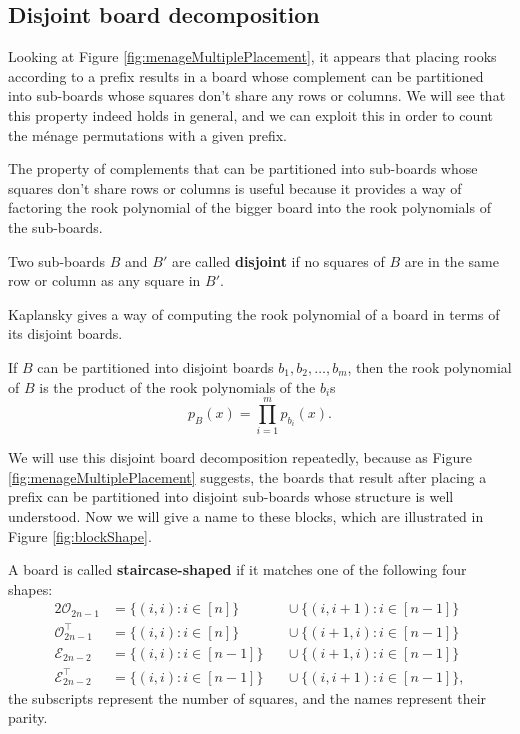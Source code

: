 \subsection{Disjoint board decomposition}
Looking at Figure \ref{fig:menageMultiplePlacement},
it appears that placing rooks according to a prefix
results in a board whose complement can be partitioned into
sub-boards whose squares don't share any rows or columns.
We will see that this property indeed holds in general,
and we can exploit this in order to count the m\'enage permutations
with a given prefix.



The property of complements that can be partitioned into sub-boards
whose squares don't share rows or columns is useful because it provides
a way of factoring the rook polynomial of the bigger board into the rook
polynomials of the sub-boards.
\begin{definition}
  Two sub-boards $B$ and $B'$ are called \textbf{disjoint} if no squares of $B$ are
  in the same row or column as any square in $B'$.
\end{definition}

Kaplansky gives a way of computing the rook polynomial of a board in terms of
its disjoint boards.
\begin{theorem}
  If $B$ can be partitioned into disjoint boards $b_1, b_2, \dots, b_m$,
  then the rook polynomial of $B$ is the product of the rook polynomials of
  the $b_i$s \begin{equation}
    p_B(x) = \prod_{i=1}^m p_{b_i}(x).
  \end{equation}
\label{thm:productOfDisjointBoards}
\end{theorem}

We will use this disjoint board decomposition repeatedly, because as
Figure \ref{fig:menageMultiplePlacement} suggests, the boards that result
after placing a prefix can be partitioned into disjoint sub-boards whose
structure is well understood. Now we will give a name to these blocks,
which are illustrated in Figure \ref{fig:blockShape}.



\begin{definition}
  A board is called \textbf{staircase-shaped} if it matches one of the
  following four shapes:
  \begin{alignat*}{2}
    \mathcal{O}_{2n-1}           &= \{(i,i) : i \in [n]\}    &&\cup\ \{(i,i+1) : i \in [n-1]\} \\
    \mathcal{O}_{2n-1}^\intercal &= \{(i,i) : i \in [n]\}    &&\cup\ \{(i+1,i) : i \in [n-1]\} \\
    \mathcal{E}_{2n-2}           &= \{(i,i) : i \in [n-1]\}\ &&\cup\ \{(i+1,i) : i \in [n-1]\} \\
    \mathcal{E}_{2n-2}^\intercal &= \{(i,i) : i \in [n-1]\}\ &&\cup\ \{(i,i+1) : i \in [n-1]\},
  \end{alignat*}
  the subscripts represent the number of squares, and the names represent their
  parity.
  \label{def:staircaseShaped}
\end{definition}

